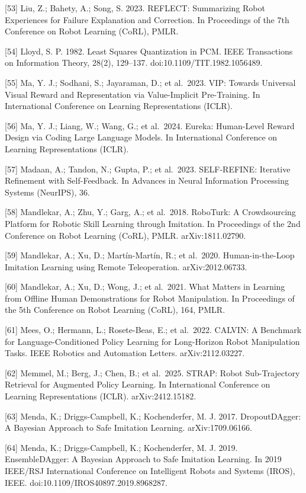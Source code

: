 \documentclass[
  11pt,
]{article}
\begin{document}
{[}53{]} Liu, Z.; Bahety, A.; Song, S. 2023. REFLECT: Summarizing Robot
Experiences for Failure Explanation and Correction. In Proceedings of
the 7th Conference on Robot Learning (CoRL), PMLR.

{[}54{]} Lloyd, S. P. 1982. Least Squares Quantization in PCM. IEEE
Transactions on Information Theory, 28(2), 129--137.
doi:10.1109/TIT.1982.1056489.

{[}55{]} Ma, Y. J.; Sodhani, S.; Jayaraman, D.; et al.~2023. VIP:
Towards Universal Visual Reward and Representation via Value-Implicit
Pre-Training. In International Conference on Learning Representations
(ICLR).

{[}56{]} Ma, Y. J.; Liang, W.; Wang, G.; et al.~2024. Eureka:
Human-Level Reward Design via Coding Large Language Models. In
International Conference on Learning Representations (ICLR).

{[}57{]} Madaan, A.; Tandon, N.; Gupta, P.; et al.~2023. SELF-REFINE:
Iterative Refinement with Self-Feedback. In Advances in Neural
Information Processing Systems (NeurIPS), 36.

{[}58{]} Mandlekar, A.; Zhu, Y.; Garg, A.; et al.~2018. RoboTurk: A
Crowdsourcing Platform for Robotic Skill Learning through Imitation. In
Proceedings of the 2nd Conference on Robot Learning (CoRL), PMLR.
arXiv:1811.02790.

{[}59{]} Mandlekar, A.; Xu, D.; Martín-Martín, R.; et al.~2020.
Human-in-the-Loop Imitation Learning using Remote Teleoperation.
arXiv:2012.06733.

{[}60{]} Mandlekar, A.; Xu, D.; Wong, J.; et al.~2021. What Matters in
Learning from Offline Human Demonstrations for Robot Manipulation. In
Proceedings of the 5th Conference on Robot Learning (CoRL), 164, PMLR.

{[}61{]} Mees, O.; Hermann, L.; Rosete-Beas, E.; et al.~2022. CALVIN: A
Benchmark for Language-Conditioned Policy Learning for Long-Horizon
Robot Manipulation Tasks. IEEE Robotics and Automation Letters.
arXiv:2112.03227.

{[}62{]} Memmel, M.; Berg, J.; Chen, B.; et al.~2025. STRAP: Robot
Sub-Trajectory Retrieval for Augmented Policy Learning. In International
Conference on Learning Representations (ICLR). arXiv:2412.15182.

{[}63{]} Menda, K.; Driggs-Campbell, K.; Kochenderfer, M. J. 2017.
DropoutDAgger: A Bayesian Approach to Safe Imitation Learning.
arXiv:1709.06166.

{[}64{]} Menda, K.; Driggs-Campbell, K.; Kochenderfer, M. J. 2019.
EnsembleDAgger: A Bayesian Approach to Safe Imitation Learning. In 2019
IEEE/RSJ International Conference on Intelligent Robots and Systems
(IROS), IEEE. doi:10.1109/IROS40897.2019.8968287.
\end{document}

